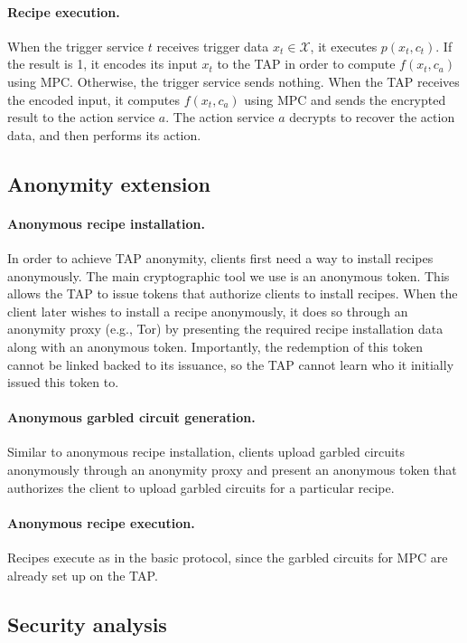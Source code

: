 \paragraph{Recipe execution.}
When the trigger service $t$ receives trigger data $x_t \in \mathcal{X}$, it
executes $p(x_t, c_t)$. If the result is 1, it encodes its input $x_t$ to the
TAP in order to compute $f(x_t, c_a)$ using MPC. Otherwise, the trigger service
sends nothing. When the TAP receives the encoded input, it computes $f(x_t,
c_a)$ using MPC and sends the encrypted result to the action service $a$. The
action service $a$ decrypts to recover the action data, and then performs its
action.

\subsection{Anonymity extension}

\paragraph{Anonymous recipe installation.} In order to achieve TAP anonymity,
clients first need a way to install recipes anonymously. The main cryptographic
tool we use is an anonymous token. This allows the TAP to issue tokens that
authorize clients to install recipes. When the client later wishes to install a
recipe anonymously, it does so through an anonymity proxy (e.g., Tor) by
presenting the required recipe installation data along with an anonymous
token. Importantly, the redemption of this token cannot be linked backed to its
issuance, so the TAP cannot learn who it initially issued this token to.

\paragraph{Anonymous garbled circuit generation.}
Similar to anonymous recipe installation, clients upload garbled circuits
anonymously through an anonymity proxy and present an anonymous token that
authorizes the client to upload garbled circuits for a particular recipe.

\paragraph{Anonymous recipe execution.} Recipes execute as in the basic
protocol, since the garbled circuits for MPC are already set up on the TAP.

\subsection{Security analysis}

